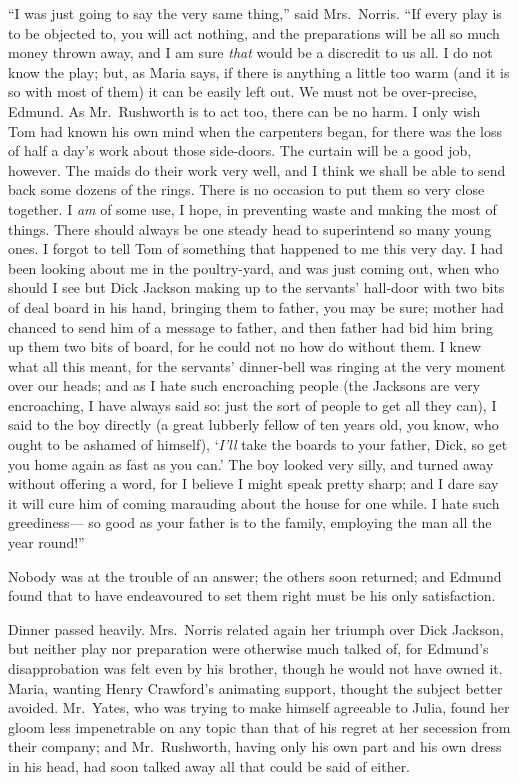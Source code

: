 ``I was just going to say the very same thing,'' said Mrs.\ Norris.
``If every play is to be objected to, you will act nothing,
and the preparations will be all so much money thrown away,
and I am sure \emph{that} would be a discredit to us all.
I do not know the play; but, as Maria says, if there
is anything a little too warm (and it is so with most
of them) it can be easily left out.  We must not be
over-precise, Edmund.  As Mr.\ Rushworth is to act too,
there can be no harm.  I only wish Tom had known his own
mind when the carpenters began, for there was the loss
of half a day's work about those side-doors. The curtain
will be a good job, however.  The maids do their work
very well, and I think we shall be able to send back
some dozens of the rings.  There is no occasion to put
them so very close together.  I \emph{am} of some use, I hope,
in preventing waste and making the most of things.
There should always be one steady head to superintend
so many young ones.  I forgot to tell Tom of something
that happened to me this very day.  I had been looking
about me in the poultry-yard, and was just coming out,
when who should I see but Dick Jackson making up
to the servants' hall-door with two bits of deal board
in his hand, bringing them to father, you may be sure;
mother had chanced to send him of a message to father,
and then father had bid him bring up them two bits of board,
for he could not no how do without them.  I knew what all
this meant, for the servants' dinner-bell was ringing
at the very moment over our heads; and as I hate such
encroaching people (the Jacksons are very encroaching,
I have always said so:  just the sort of people to get
all they can), I said to the boy directly (a great lubberly
fellow of ten years old, you know, who ought to be ashamed
of himself), `\emph{I'll} take the boards to your father,
Dick, so get you home again as fast as you can.'
The boy looked very silly, and turned away without
offering a word, for I believe I might speak pretty sharp;
and I dare say it will cure him of coming marauding
about the house for one while.  I hate such greediness---%
so good as your father is to the family, employing the man
all the year round!''

Nobody was at the trouble of an answer; the others
soon returned; and Edmund found that to have endeavoured
to set them right must be his only satisfaction.

Dinner passed heavily.  Mrs.\ Norris related again
her triumph over Dick Jackson, but neither play nor
preparation were otherwise much talked of, for Edmund's
disapprobation was felt even by his brother, though he
would not have owned it.  Maria, wanting Henry Crawford's
animating support, thought the subject better avoided.
Mr.\ Yates, who was trying to make himself agreeable to Julia,
found her gloom less impenetrable on any topic than
that of his regret at her secession from their company;
and Mr.\ Rushworth, having only his own part and his own
dress in his head, had soon talked away all that could
be said of either.


